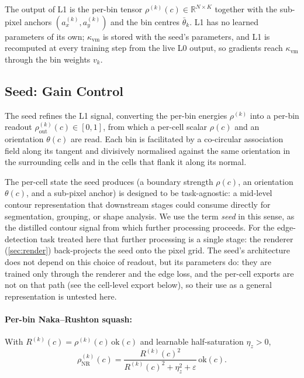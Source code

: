 \documentclass[11pt,a4paper]{article}
\newcommand{\R}{\mathbb{R}}
\begin{document}
The output of L1 is the per-bin tensor $\rho^{(k)}(c) \in \R^{N \times K}$ together with the sub-pixel anchors $(a_x^{(k)}, a_y^{(k)})$ and the bin centres $\bar\theta_k$. L1 has no learned parameters of its own; $\kappa_{\mathrm{vm}}$ is stored with the seed's parameters, and L1 is recomputed at every training step from the live L0 output, so gradients reach $\kappa_{\mathrm{vm}}$ through the bin weights $v_k$.

\subsection{Seed: Gain Control}\label{sec:seed}

The seed refines the L1 signal, converting the per-bin energies $\rho^{(k)}$ into a per-bin readout $\rho_{\mathrm{out}}^{(k)}(c) \in [0, 1]$, from which a per-cell scalar $\rho(c)$ and an orientation $\theta(c)$ are read. Each bin is facilitated by a co-circular association field along its tangent and divisively normalised against the same orientation in the surrounding cells and in the cells that flank it along its normal.

The per-cell state the seed produces (a boundary strength $\rho(c)$, an orientation $\theta(c)$, and a sub-pixel anchor) is designed to be task-agnostic: a mid-level contour representation that downstream stages could consume directly for segmentation, grouping, or shape analysis. We use the term \emph{seed} in this sense, as the distilled contour signal from which further processing proceeds. For the edge-detection task treated here that further processing is a single stage: the renderer (\cref{sec:render}) back-projects the seed onto the pixel grid. The seed's architecture does not depend on this choice of readout, but its parameters do: they are trained only through the renderer and the edge loss, and the per-cell exports are not on that path (see the cell-level export below), so their use as a general representation is untested here.

\paragraph{Per-bin Naka--Rushton squash:}
With $R^{(k)}(c) = \rho^{(k)}(c)\,\mathrm{ok}(c)$ and learnable half-saturation $\eta_z > 0$,
\begin{equation}\label{eq:rho-nr}
  \rho_{\mathrm{NR}}^{(k)}(c) = \frac{R^{(k)}(c)^2}{R^{(k)}(c)^2 + \eta_z^2 + \varepsilon}\,\mathrm{ok}(c).
\end{equation}
\end{document}
